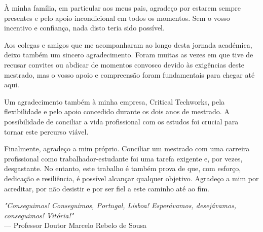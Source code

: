 À minha família, em particular aos meus pais, agradeço por estarem sempre presentes e pelo apoio incondicional em todos os momentos. Sem o vosso incentivo e confiança, nada disto teria sido possível.  

Aos colegas e amigos que me acompanharam ao longo desta jornada académica, deixo também um sincero agradecimento. Foram muitas as vezes em que tive de recusar convites ou abdicar de momentos convosco devido às exigências deste mestrado, mas o vosso apoio e compreensão foram fundamentais para chegar até aqui.  

Um agradecimento também à minha empresa, Critical Techworks, pela flexibilidade e pelo apoio concedido durante os dois anos de mestrado. A possibilidade de conciliar a vida profissional com os estudos foi crucial para tornar este percurso viável.  

Finalmente, agradeço a mim próprio. Conciliar um mestrado com uma carreira profissional como trabalhador-estudante foi uma tarefa exigente e, por vezes, desgastante. No entanto, este trabalho é também prova de que, com esforço, dedicação e resiliência, é possível alcançar qualquer objetivo. Agradeço a mim por acreditar, por não desistir e por ser fiel a este caminho até ao fim.

\vspace*{\fill}
\begin{flushright}
\textit{"Conseguimos! Conseguimos, Portugal, Lisboa! Esperávamos, desejávamos, conseguimos! Vitória!"} \\
--- Professor Doutor Marcelo Rebelo de Sousa
\end{flushright}
\vspace*{\fill}